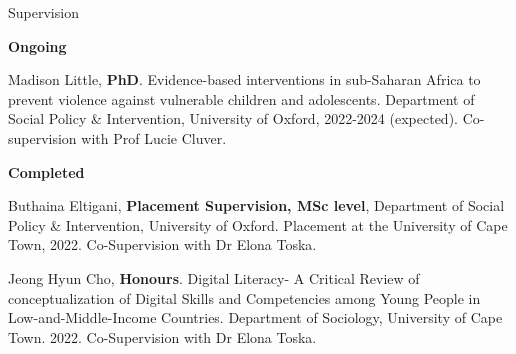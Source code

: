 \begin{rSection}{Supervision}

\vspace{1em}
\hspace{1.8em} \large  {\textbf{Ongoing}}
\par

\begin{etaremune}
\item {Madison Little, \textbf{PhD}. Evidence-based interventions in sub-Saharan Africa to prevent violence against vulnerable children and adolescents. Department of Social Policy \& Intervention, University of Oxford, 2022-2024 (expected). Co-supervision with Prof Lucie Cluver.}

\vspace{1em}
\large  {\textbf{Completed}}
\par

\item {Buthaina Eltigani, \textbf{Placement Supervision, MSc level}, Department of Social Policy \& Intervention, University of Oxford. Placement at the University of Cape Town, 2022. Co-Supervision with Dr Elona Toska.}

\item {Jeong Hyun Cho, \textbf{Honours}. Digital Literacy- A Critical Review of conceptualization of Digital Skills and Competencies among Young People in Low-and-Middle-Income Countries. Department of Sociology, University of Cape Town. 2022. Co-Supervision with Dr Elona Toska.}

\end{etaremune}

\end{rSection}

